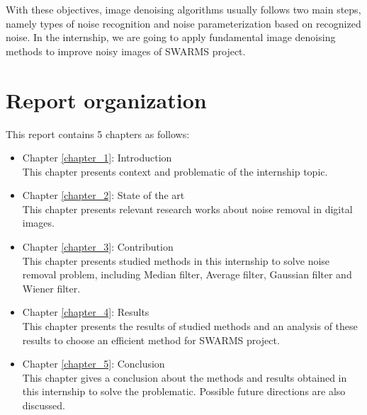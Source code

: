 With these objectives, image denoising algorithms usually follows two main steps, namely types of noise recognition and noise parameterization based on recognized noise. In the internship, we are going to apply fundamental image denoising methods to improve noisy images of SWARMS project.

\section{Report organization}

This report contains 5 chapters as follows:

\begin{itemize}
\item Chapter \ref{chapter_1}: Introduction \\
	This chapter presents context and problematic of the internship topic. 
\item Chapter \ref{chapter_2}: State of the art \\
	This chapter presents relevant research works about noise removal in digital images.
\item Chapter \ref{chapter_3}: Contribution \\
	This chapter presents studied methods in this internship to solve noise removal problem, including Median filter, Average filter, Gaussian filter and Wiener filter. 
\item Chapter \ref{chapter_4}: Results \\
	This chapter presents the results of studied methods and an analysis of these results to choose an efficient method for SWARMS project.
\item Chapter \ref{chapter_5}: Conclusion \\
	This chapter gives a conclusion about the methods and results obtained in this internship to solve the problematic. Possible future directions are also discussed. 
\end{itemize}
